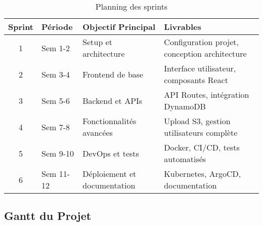 \begin{table}[H]
    \centering
    \begin{tabularx}{\textwidth}{|c|X|X|X|}
        \hline
        \textbf{Sprint} & \textbf{Période} & \textbf{Objectif Principal} & \textbf{Livrables} \\
        \hline
        1 & Sem 1-2 & Setup et architecture & Configuration projet, conception architecture \\
        \hline
        2 & Sem 3-4 & Frontend de base & Interface utilisateur, composants React \\
        \hline
        3 & Sem 5-6 & Backend et APIs & API Routes, intégration DynamoDB \\
        \hline
        4 & Sem 7-8 & Fonctionnalités avancées & Upload S3, gestion utilisateurs complète \\
        \hline
        5 & Sem 9-10 & DevOps et tests & Docker, CI/CD, tests automatisés \\
        \hline
        6 & Sem 11-12 & Déploiement et documentation & Kubernetes, ArgoCD, documentation \\
        \hline
    \end{tabularx}
    \caption{Planning des sprints}
    \label{tab:sprint_planning}
\end{table}

\subsection{Gantt du Projet}

